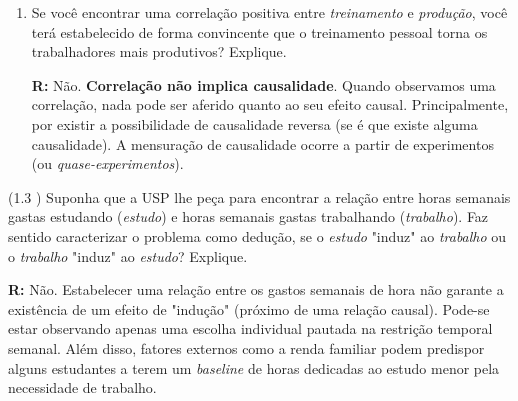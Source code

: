 \documentclass[12pt,letterpaper, onecolumn]{exam}
\renewenvironment{solution}
  {\par\noindent\textbf{R:}\enspace\color{blue}}
  {\par\color{black}}
\begin{document}
\begin{questions}
\begin{enumerate}[label=(\alph*)]
    \begin{solution}
        O ambiente de trabalho e tecnologias empregadas na produção afetam a produtividade do trabalhador, sendo estas características escolhidas exogêneamente por parte das firmas.
    \end{solution}
    \item Se você encontrar uma correlação positiva entre \textit{treinamento} e \textit{produção}, você terá estabelecido de forma convincente que o treinamento pessoal torna os trabalhadores mais produtivos? Explique.
    \begin{solution}
        Não. \textbf{Correlação não implica causalidade}. Quando observamos uma correlação, nada pode ser aferido quanto ao seu efeito causal. Principalmente, por existir a possibilidade de causalidade reversa (se é que existe alguma causalidade). A mensuração de causalidade ocorre a partir de experimentos (ou \textit{quase-experimentos}). 
    \end{solution}
    \end{enumerate}


    
    \question (1.3 \citep{wooldridge2016}) Suponha que a USP lhe peça para encontrar a relação entre horas semanais gastas estudando (\textit{estudo}) e horas semanais gastas trabalhando (\textit{trabalho}). Faz sentido caracterizar o problema como dedução, se o \textit{estudo} "induz" ao \textit{trabalho} ou o \textit{trabalho} "induz" ao \textit{estudo}? Explique.
    \begin{solution}
        Não. Estabelecer uma relação entre os gastos semanais de hora não garante a existência de um efeito de "indução" (próximo de uma relação causal). Pode-se estar observando apenas uma escolha individual pautada na restrição temporal semanal. Além disso, fatores externos como a renda familiar podem predispor alguns estudantes a terem um \textit{baseline} de horas dedicadas ao estudo menor pela necessidade de trabalho.
    \end{solution}




\end{questions}
\end{document}
